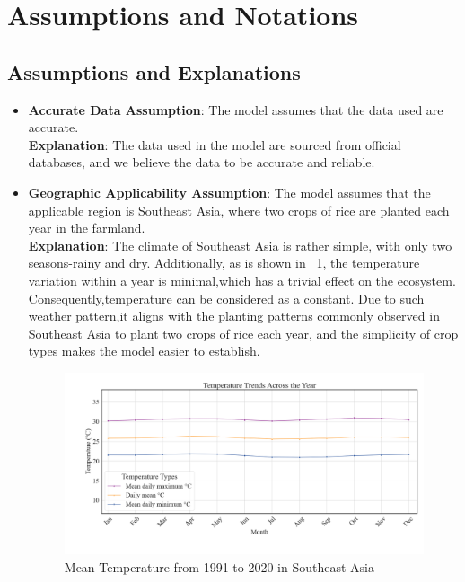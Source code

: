 \documentclass{HZNUMCM}
\begin{document}
  \section{Assumptions and Notations}
    \subsection{Assumptions and Explanations}
      \begin{itemize}
        \item \textbf{Accurate Data Assumption}: The model assumes that the data used are accurate.\\
        \textbf{Explanation}: The data used in the model are sourced from official databases, and we believe the data to be accurate and reliable.
        
        \item \textbf{Geographic Applicability Assumption}: The model assumes that the applicable region is Southeast Asia,
         where two crops of rice are planted each year in the farmland.\\
        \textbf{Explanation}: The climate of Southeast Asia is rather simple, 
        with only two seasons-rainy and dry. Additionally, as is shown in \figurename~\ref{fig:Temperature},
        the temperature variation within a year is minimal,which has a trivial effect on the ecosystem.
        Consequently,temperature can be considered as a constant.
        Due to such weather pattern,it aligns with the planting patterns commonly observed in Southeast Asia to plant two crops of rice each year,
         and the simplicity of crop types makes the model easier to establish.
        
        \begin{figure}[H]
          \centering
          \includegraphics[width=\linewidth]{images/AverTemper.png}
          \caption{Mean Temperature from 1991 to 2020 in Southeast Asia}
          \label{fig:Temperature}
        \end{figure}


\end{itemize}
\end{document}
